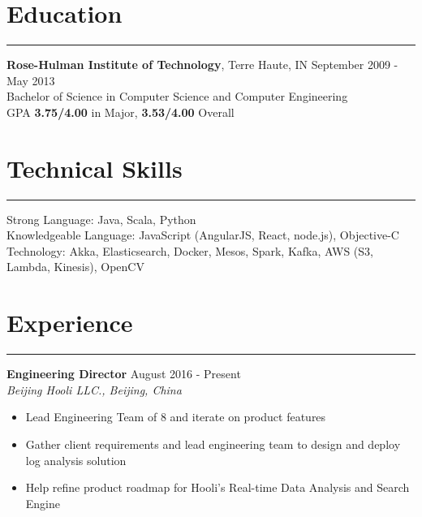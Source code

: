 \documentclass[line]{res} %
\begin{document}

\address{
  33 Suzhou Jie, Room 1421, Haidian District\\
  Beijing, China 100000\\
  +86 13544439722\\
  simon@divby0.io
}

\begin{resume}

  \section{Education}
  \rule{\textwidth}{1pt}
    \textbf{Rose-Hulman Institute of Technology}, Terre Haute, IN
    \hfill September 2009 - May 2013 \\
    Bachelor of Science in Computer Science and Computer Engineering \\
    GPA \textbf{3.75/4.00} in Major, \textbf{3.53/4.00} Overall

  \section{Technical Skills}
  \rule{\textwidth}{1pt}
    Strong Language: Java, Scala, Python \\
    Knowledgeable Language: JavaScript (AngularJS, React, node.js), Objective-C \\
    Technology: Akka, Elasticsearch, Docker, Mesos, Spark, Kafka, AWS (S3, Lambda, Kinesis), OpenCV

  \section{Experience}
  \rule{\textwidth}{1pt}
    \textbf{Engineering Director}
    \hfill August 2016 - Present \\
    \textit{Beijing Hooli LLC., Beijing, China}
    \begin{itemize} \itemsep -2pt
      \item Lead Engineering Team of 8 and iterate on product features
      \item Gather client requirements and lead engineering team to design and deploy log analysis solution
      \item Help refine product roadmap for Hooli's Real-time Data Analysis and Search Engine
    \end{itemize}


\end{resume}
\end{document}
